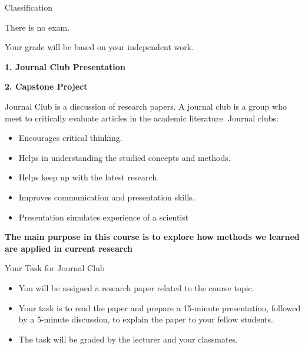 \begin{frame}{Classification}
\begin{center}
    \Large
    There is no exam.
    
    \vspace{1em}
    Your grade will be based on your independent work.

    \vspace{1em}
    \color{primary}
    \textbf{1. Journal Club Presentation}
    
    \vspace{1em}
    \color{secondary}
    \textbf{2. Capstone Project} 
\end{center}
\end{frame}

\begin{frame}{Journal Club is a discussion of research papers.}
   A journal club is a group who meet to critically evaluate  articles in the academic literature. Journal clubs:
     \begin{itemize}
        \item Encourages critical thinking.
        \item Helps in understanding the studied concepts and methods.
        \item Helps keep up with the latest research.
        \item Improves communication and presentation skills.
        \item Presentation simulates experience of a scientist
    \end{itemize}
\vspace{1em}
\textbf{The main purpose in this course is to explore how methods we learned are applied in current research}
    
\end{frame}
\begin{frame}{Your Task for Journal Club}
    \begin{itemize}
        \item You will be assigned a research paper related to the course topic.
        \item Your task is to read the paper and prepare a 15-minute presentation, followed by a 5-minute discussion, to explain the paper to your fellow students.
        \item The task will be graded by the lecturer and your classmates. 
    \end{itemize}
\end{frame}


